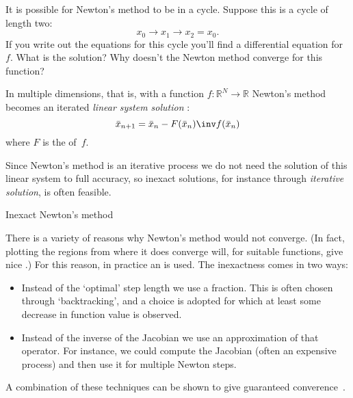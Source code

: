 \begin{exercise}
  It is possible for Newton's method to be in a cycle. Suppose this is
  a cycle of length two: \[ x_0\rightarrow x_1 \rightarrow x_2=x_0. \]
  If you write out the equations for this cycle you'll find a
  differential equation for~$f$. What is the solution? Why doesn't the
  Newton method converge for this function?
\end{exercise}

In multiple dimensions, that is, with a function
$f\colon\mathbb{R}^N\rightarrow\mathbb{R}$
Newton's method becomes an iterated
\emph{linear system solution}%
:
\[ \bar x_{n+1} = \bar x_n-F(\bar x_n)\inv f(\bar x_n) \]
where $F$ is the  of~$f$.

Since Newton's method is an iterative process we do not need the
solution of this linear system to full accuracy, so inexact solutions,
for instance through
\emph{iterative solution},
is often feasible.

 {Inexact Newton's method}

There is a variety of reasons why Newton's method would not converge.
(In fact, plotting the regions from where it does converge will, for
suitable functions, give nice .)
For this reason, in practice an
 is used. The inexactness comes
in two ways:
\begin{itemize}
\item Instead of the `optimal' step length we use a fraction. This is
  often chosen through `backtracking', and a choice is adopted for
  which at least some decrease in function value is observed.
\item Instead of the inverse of the Jacobian we use an approximation
  of that operator. For instance, we could compute the Jacobian (often
  an expensive process) and then use it for multiple Newton steps.
\end{itemize}
A combination of these techniques can be shown to give guaranteed
converence~\cite{zhwa94}.

